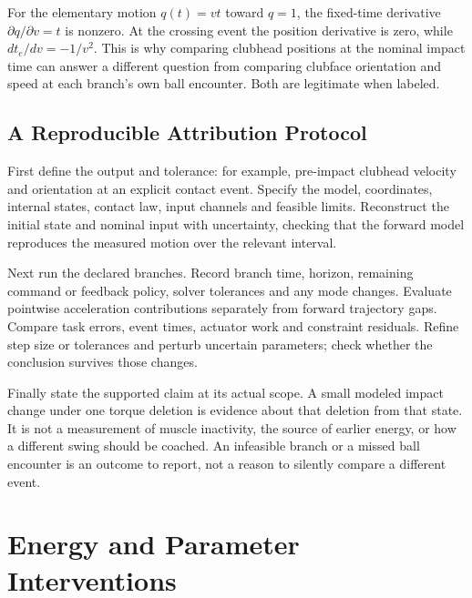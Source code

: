 For the elementary motion $q(t)=vt$ toward $q=1$, the fixed-time derivative $\partial q/\partial v=t$ is nonzero. At the crossing event the position derivative is zero, while $dt_e/dv=-1/v^2$. This is why comparing clubhead positions at the nominal impact time can answer a different question from comparing clubface orientation and speed at each branch's own ball encounter. Both are legitimate when labeled.

\subsection{A Reproducible Attribution Protocol}
\label{alg:ch7:attribution}
First define the output and tolerance: for example, pre-impact clubhead velocity and orientation at an explicit contact event. Specify the model, coordinates, internal states, contact law, input channels and feasible limits. Reconstruct the initial state and nominal input with uncertainty, checking that the forward model reproduces the measured motion over the relevant interval.

Next run the declared branches. Record branch time, horizon, remaining command or feedback policy, solver tolerances and any mode changes. Evaluate pointwise acceleration contributions separately from forward trajectory gaps. Compare task errors, event times, actuator work and constraint residuals. Refine step size or tolerances and perturb uncertain parameters; check whether the conclusion survives those changes.

Finally state the supported claim at its actual scope. A small modeled impact change under one torque deletion is evidence about that deletion from that state. It is not a measurement of muscle inactivity, the source of earlier energy, or how a different swing should be coached. An infeasible branch or a missed ball encounter is an outcome to report, not a reason to silently compare a different event.

\section{Energy and Parameter Interventions}
\label{sec:ch7:energy}

